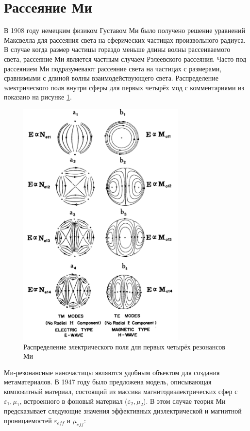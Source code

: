 \section{Рассеяние Ми}

В 1908 году немецким физиком Густавом Ми было получено \cite{Mie1908} решение уравнений Максвелла для рассеяния света на сферических частицах произвольного радиуса. В случае когда размер частицы гораздо меньше длины волны рассеиваемого света, рассеяние Ми является частным случаем Рэлеевского рассеяния. Часто под рассеянием Ми подразумевают рассеяние света на частицах с размерами, сравнимыми с длиной волны взаимодействующего света. Распределение электрического поля внутри сферы для первых четырёх мод с комментариями из \cite{Bohren1998} показано на рисунке \ref{fig:mie_example}.

\begin{figure}[H]
	\centering
	\includegraphics[width=0.75\textwidth]{img/Mie_total}
	\caption{Распределение электрического поля для первых четырёх резонансов Ми}
	\label{fig:mie_example}
\end{figure}

Ми-резонансные наночастицы являются удобным объектом для создания метаматериалов. В 1947 году было предложена \cite{Lewin1947} модель, описывающая композитный материал, состоящий из массива магнитодиэлектрических сфер с $\varepsilon_1, \mu_1$, встроенного в фоновый материал ($\varepsilon_2, \mu_2$). В этом случае теория Ми предсказывает следующие значения эффективных диэлектрической и магнитной проницаемостей $\varepsilon_{eff}$ и $\mu_{eff}$:


